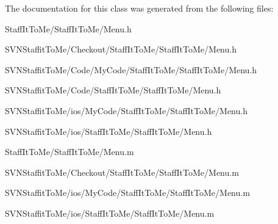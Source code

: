 \-The documentation for this class was generated from the following files\-:\begin{DoxyCompactItemize}
\item 
\-Staff\-It\-To\-Me/\-Staff\-It\-To\-Me/\-Menu.\-h\item 
\-S\-V\-N\-Staffit\-To\-Me/\-Checkout/\-Staff\-It\-To\-Me/\-Staff\-It\-To\-Me/\-Menu.\-h\item 
\-S\-V\-N\-Staffit\-To\-Me/\-Code/\-My\-Code/\-Staff\-It\-To\-Me/\-Staff\-It\-To\-Me/\-Menu.\-h\item 
\-S\-V\-N\-Staffit\-To\-Me/\-Code/\-Staff\-It\-To\-Me/\-Staff\-It\-To\-Me/\-Menu.\-h\item 
\-S\-V\-N\-Staffit\-To\-Me/ios/\-My\-Code/\-Staff\-It\-To\-Me/\-Staff\-It\-To\-Me/\-Menu.\-h\item 
\-S\-V\-N\-Staffit\-To\-Me/ios/\-Staff\-It\-To\-Me/\-Staff\-It\-To\-Me/\-Menu.\-h\item 
\-Staff\-It\-To\-Me/\-Staff\-It\-To\-Me/\-Menu.\-m\item 
\-S\-V\-N\-Staffit\-To\-Me/\-Checkout/\-Staff\-It\-To\-Me/\-Staff\-It\-To\-Me/\-Menu.\-m\item 
\-S\-V\-N\-Staffit\-To\-Me/ios/\-My\-Code/\-Staff\-It\-To\-Me/\-Staff\-It\-To\-Me/\-Menu.\-m\item 
\-S\-V\-N\-Staffit\-To\-Me/ios/\-Staff\-It\-To\-Me/\-Staff\-It\-To\-Me/\-Menu.\-m\end{DoxyCompactItemize}
